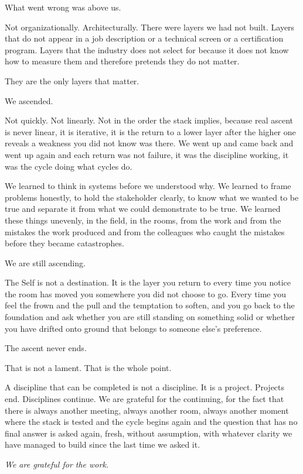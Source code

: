What went wrong was above us.

Not organizationally. Architecturally. There were layers we had not built. Layers that do not appear in a job description or a technical screen or a certification program. Layers that the industry does not select for because it does not know how to measure them and therefore pretends they do not matter.

They are the only layers that matter.

We ascended.

Not quickly. Not linearly. Not in the order the stack implies, because real ascent is never linear, it is iterative, it is the return to a lower layer after the higher one reveals a weakness you did not know was there. We went up and came back and went up again and each return was not failure, it was the discipline working, it was the cycle doing what cycles do.

We learned to think in systems before we understood why. We learned to frame problems honestly, to hold the stakeholder clearly, to know what we wanted to be true and separate it from what we could demonstrate to be true. We learned these things unevenly, in the field, in the rooms, from the work and from the mistakes the work produced and from the colleagues who caught the mistakes before they became catastrophes.

We are still ascending.

The Self is not a destination. It is the layer you return to every time you notice the room has moved you somewhere you did not choose to go. Every time you feel the frown and the pull and the temptation to soften, and you go back to the foundation and ask whether you are still standing on something solid or whether you have drifted onto ground that belongs to someone else's preference.

The ascent never ends.

That is not a lament. That is the whole point.

A discipline that can be completed is not a discipline. It is a project. Projects end. Disciplines continue. We are grateful for the continuing, for the fact that there is always another meeting, always another room, always another moment where the stack is tested and the cycle begins again and the question that has no final answer is asked again, fresh, without assumption, with whatever clarity we have managed to build since the last time we asked it.

\textit{We are grateful for the work.}

